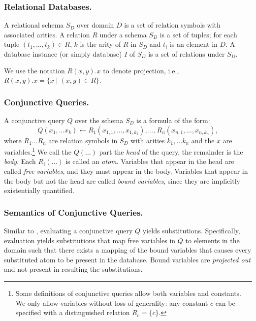 \subsubsection*{Relational Databases.}
A relational schema $S_D$ over domain $D$ is a set of relation symbols with
 associated arities.
A relation $R$ under a schema $S_D$ is a set of tuples;
 for each tuple $(t_1,\ldots,t_k) \in R$,
 $k$ is the arity of $R$ in $S_D$ and $t_i$ is an element in $D$.
A database instance (or simply database) $I$ of $S_D$ is a set of relations under $S_D$.

We use the notation $R(x, y).x$ to denote projection,
 i.e., $R(x, y).x = \{x \mid (x, y) \in R \}$.

\subsubsection*{Conjunctive Queries.}
A conjunctive query $Q$ over the schema $S_D$ is a formula of the form:
\[
  Q(x_1,\ldots x_k) \gets R_1(x_{1,1},\ldots,x_{1,k_1}),\ldots,
  R_n(x_{n,1},\ldots,x_{n,k_n}),
\]
where $R_1\ldots R_n$ are relation symbols in $S_D$ with arities
$k_1,\ldots k_n$ and the $x$ are variables.\footnote{
  Some definitions of conjunctive queries allow both variables and constants.
  We only allow variables without loss of generality:
  any constant $c$ can be specified with a distinguished relation $R_{c} = \{c\}$.}
We call the $Q(\ldots)$ part the \textit{head} of the query,
 the remainder is the \textit{body}.
Each $R_i(\ldots)$ is called an {\em atom}.
Variables that appear in the head are called \textit{free variables},
 and they must appear in the body.
Variables that appear in the body but not the head are called \textit{bound variables},
 since they are implicitly existentially quantified.


\subsubsection*{Semantics of Conjunctive Queries.}
Similar to \ematching,
 evaluating a conjunctive query $Q$ yields substitutions.
Specifically,
 evaluation yields substitutions
 that map free variables in $Q$ to
 elements in the domain such that
 there exists a mapping of the bound variables
 that causes every substituted atom to be present in the database.
Bound variables are {\em projected out} and not present in
 resulting the substitutions.

